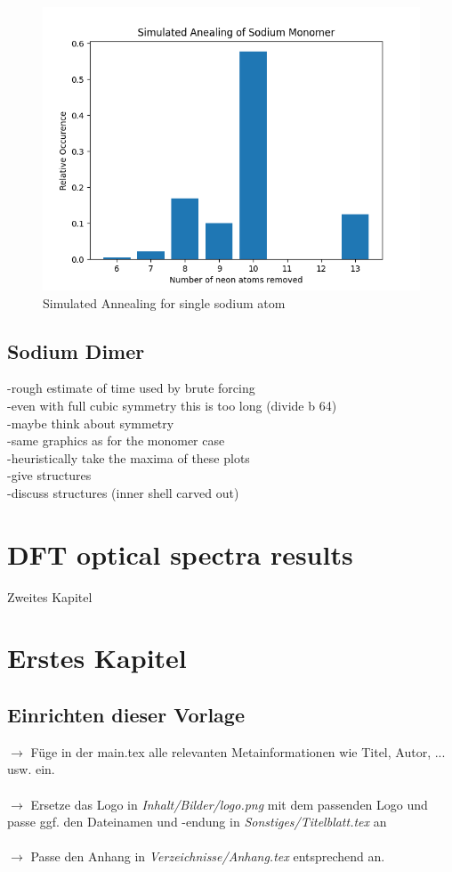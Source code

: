 \begin{figure}[h!]
	\centering
	\includegraphics[scale=0.5]{./Inhalt/Bilder/optimal_defect_simulated_annealing.png}
	\caption{Simulated Annealing for single sodium atom}
	\label{fig:simulatedannealingsodium}
\end{figure}  

\section{Sodium Dimer}
-rough estimate of time used by brute forcing\\
-even with full cubic symmetry this is too long (divide b 64)\\
-maybe think about symmetry\\
-same graphics as for the monomer case\\
-heuristically take the maxima of these plots \\
-give structures\\
-discuss structures (inner shell carved out)\\

\chapter{DFT optical spectra results}
\label{chap:Zweites Kapitel}
%
Zweites Kapitel
%
%



\chapter{Erstes Kapitel}
%
%
\section{Einrichten dieser Vorlage}
\label{sec:Einrichten dieser Vorlage}
%
$\rightarrow$ Füge in der main.tex alle relevanten Metainformationen wie Titel, Autor, ... usw. ein.\\\\
%
$\rightarrow$ Ersetze das Logo in \textit{Inhalt/Bilder/logo.png} mit dem passenden Logo und passe ggf. den Dateinamen und -endung in \textit{Sonstiges/Titelblatt.tex} an\\\\
%
$\rightarrow$ Passe den Anhang in \textit{Verzeichnisse/Anhang.tex} entsprechend an.
%
%
